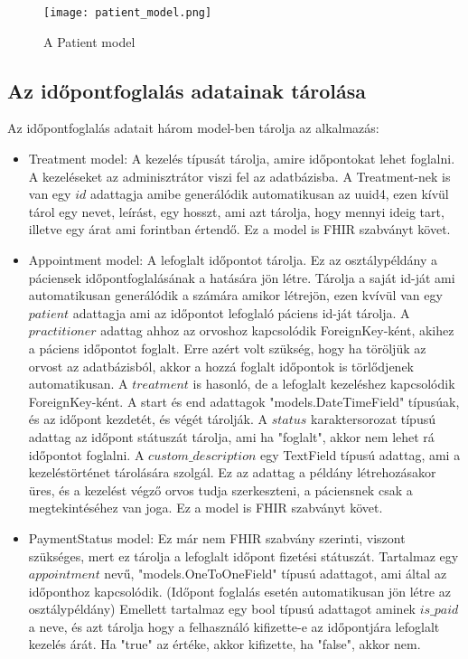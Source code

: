 \begin{figure}[H]
	\caption{A Patient model}
	\label{fig:patientmodel}
	\centering
	\texttt{[image: patient\_model.png]}
\end{figure}

\subsection{Az időpontfoglalás adatainak tárolása}

Az időpontfoglalás adatait három model-ben tárolja az alkalmazás:

\begin{itemize}
	\item Treatment model: A kezelés típusát tárolja, amire időpontokat lehet foglalni. A kezeléseket az adminisztrátor viszi fel az adatbázisba. A Treatment-nek is van egy $id$ adattagja amibe generálódik automatikusan az uuid4, ezen kívül tárol egy nevet, leírást, egy hosszt, ami azt tárolja, hogy mennyi ideig tart, illetve egy árat ami forintban értendő. Ez a model is FHIR szabványt követ.
	\item Appointment model: A lefoglalt időpontot tárolja. Ez az osztálypéldány a páciensek időpontfoglalásának a hatására jön létre. Tárolja a saját id-ját ami automatikusan generálódik a számára amikor létrejön, ezen kvívül van egy $patient$ adattagja ami az időpontot lefoglaló páciens id-ját tárolja. A $practitioner$ adattag ahhoz az orvoshoz kapcsolódik ForeignKey-ként, akihez a páciens időpontot foglalt. Erre azért volt szükség, hogy ha töröljük az orvost az adatbázisból, akkor a hozzá foglalt időpontok is törlődjenek automatikusan. A $treatment$ is hasonló, de a lefoglalt kezeléshez kapcsolódik ForeignKey-ként. A start és end adattagok "models.DateTimeField" típusúak, és az időpont kezdetét, és végét tárolják. A $status$ karaktersorozat típusú adattag az időpont státuszát tárolja, ami ha "foglalt", akkor nem lehet rá időpontot foglalni. A $custom\_description$ egy TextField típusú adattag, ami a kezeléstörténet tárolására szolgál. Ez az adattag a példány létrehozásakor üres, és a kezelést végző orvos tudja szerkeszteni, a páciensnek csak a megtekintéséhez van joga. Ez a model is FHIR szabványt követ.
	\item PaymentStatus model: Ez már nem FHIR szabvány szerinti, viszont szükséges, mert ez tárolja a lefoglalt időpont fizetési státuszát. Tartalmaz egy $appointment$ nevű, "models.OneToOneField" típusú adattagot, ami által az időponthoz kapcsolódik. (Időpont foglalás esetén automatikusan jön létre az osztálypéldány) Emellett tartalmaz egy bool típusú adattagot aminek $is\_paid$ a neve, és azt tárolja hogy a felhasználó kifizette-e az időpontjára lefoglalt kezelés árát. Ha "true" az értéke, akkor kifizette, ha "false", akkor nem.
\end{itemize}

